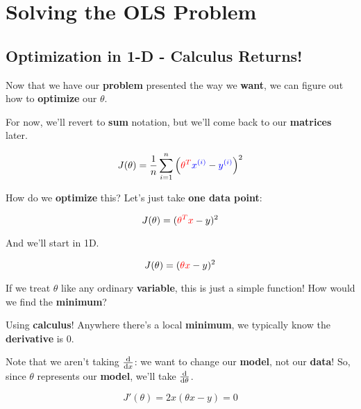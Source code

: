 
\section*{Solving the OLS Problem}

    \subsection*{Optimization in 1-D - Calculus Returns!}
    
        Now that we have our \textbf{problem} presented the way we \textbf{want}, we can figure out how to \textbf{optimize} our $\theta$.
        
        For now, we'll revert to \textbf{sum} notation, but we'll come back to our \textbf{matrices} later.
        
        \begin{equation}
            J(\theta) = 
            \frac{1}{n}  \sum_{i=1}^n 
            \left( \textcolor{red}{\theta^T} \textcolor{blue}{x^{(i)}}  
            - \textcolor{blue}{y^{(i)}} \right)^2 
        \end{equation}
        
        How do we \textbf{optimize} this? Let's just take \textbf{one data point}:
        
        \begin{equation}
            J(\theta) = (\textcolor{red}{ \theta^T x  } - y )^2
        \end{equation}
        
        And we'll start in 1D.
        
        \begin{equation}
            J(\theta) = (\textcolor{red}{\theta x}   - y )^2
        \end{equation}
        
        If we treat $\theta$ like any ordinary \textbf{variable}, this is just a simple function! How would we find the \textbf{minimum}? 
        
        Using \textbf{calculus}! Anywhere there's a local \textbf{minimum}, we typically know the \textbf{derivative} is 0.
        
        Note that we aren't taking $\frac{\dd }{\dd x}$: we want to change our \textbf{model}, not our \textbf{data}! So, since $\theta$ represents our \textbf{model}, we'll take $\frac{\dd }{\dd \theta}$.
        
        \begin{equation}
            J'(\theta) = 2x(\theta x - y ) = 0
        \end{equation}
        

